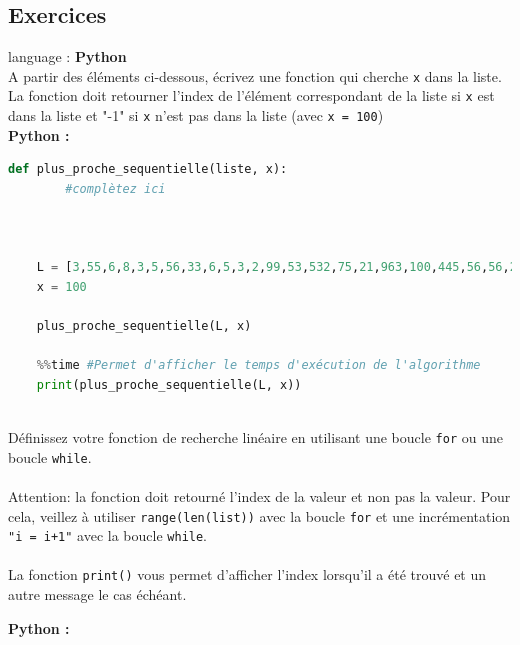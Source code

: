 \subsection{Exercices}

\begin{Exercice}[5 minutes] language : \textbf{Python}\\

A partir des éléments ci-dessous, écrivez une fonction qui cherche \lstinline{x} dans la liste.\\La fonction doit retourner l'index de l'élément correspondant de la liste si \lstinline{x} est dans la liste et "-1" si \lstinline{x} n'est pas dans la liste (avec \lstinline{x = 100})\\

\textbf{Python :}
  \begin{lstlisting}[language=Python]
    def plus_proche_sequentielle(liste, x):
        #complètez ici
        
    
    
    L = [3,55,6,8,3,5,56,33,6,5,3,2,99,53,532,75,21,963,100,445,56,56,24]
    x = 100
    
    plus_proche_sequentielle(L, x)
        
    %%time #Permet d'afficher le temps d'exécution de l'algorithme 
    print(plus_proche_sequentielle(L, x))
    
    \end{lstlisting}

\begin{conseil}
    Définissez votre fonction de recherche linéaire en utilisant une boucle \lstinline{for} ou une boucle \lstinline{while}.\\\\
    Attention: la fonction doit retourné l'index de la valeur et non pas la valeur. Pour cela, veillez à utiliser \lstinline{range(len(list))} avec la boucle \lstinline{for} et une incrémentation \lstinline{"i = i+1"} avec la boucle \lstinline{while}.\\\\
    La fonction \lstinline{print()} vous permet d'afficher l'index lorsqu'il a été trouvé et un autre message le cas échéant. 
\end{conseil}
    
\begin{solution}
\textbf{Python :}
    
    
\end{solution}

\end{Exercice}

